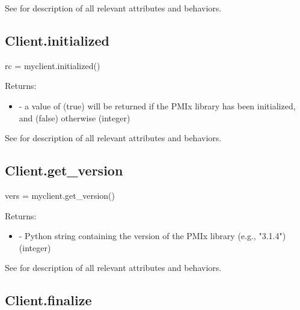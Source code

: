 See  for description of all relevant attributes and behaviors.


\subsection{Client.initialized}

\format

\pyspecificstart
\begin{codepar}
rc = myclient.initialized()
\end{codepar}
\pyspecificend

Returns:

\begin{itemize}
    \item {} - a value of  (true) will be returned if the \ac{PMIx} library has been initialized, and  (false) otherwise (integer)

\end{itemize}

See  for description of all relevant attributes and behaviors.


\subsection{Client.get_version}

\format

\pyspecificstart
\begin{codepar}
vers = myclient.get_version()
\end{codepar}
\pyspecificend

Returns:

\begin{itemize}
    \item {} - Python string containing the version of the \ac{PMIx} library (e.g., "3.1.4") (integer)

\end{itemize}

See  for description of all relevant attributes and behaviors.


\subsection{Client.finalize}

